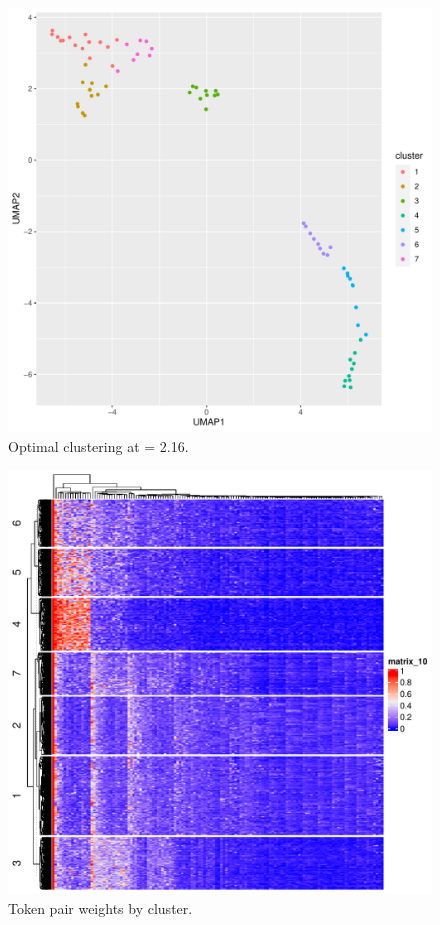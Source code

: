 \documentclass{article}
\begin{document}
\begin{figure}
	\includegraphics[width=\textwidth]{figs/encoding.pdf}
	\caption{Optimal clustering at \gamma = 2.16.}
	\label{}
\end{figure}

\begin{figure}
	\includegraphics[width=\textwidth]{figs/clusthm.pdf}
	\caption{Token pair weights by cluster.}
	\label{}
\end{figure}
\end{document}
